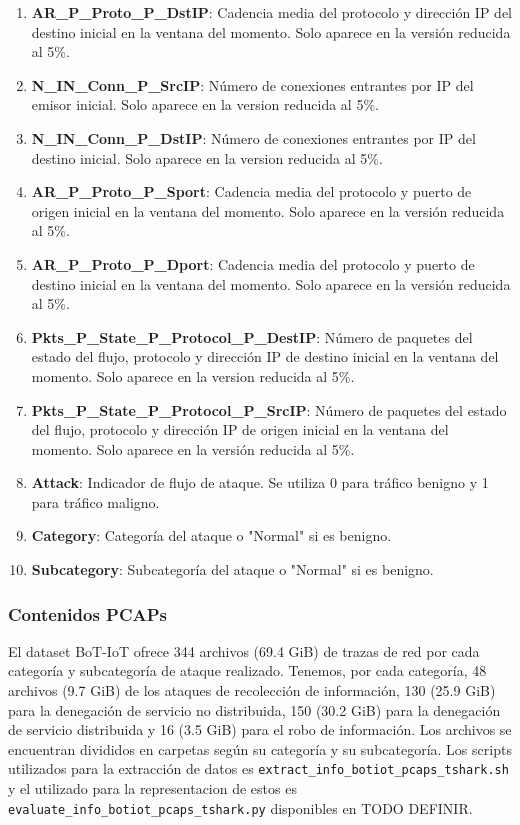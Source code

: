 \begin{enumerate}
    \item \textbf{AR\_P\_Proto\_P\_DstIP}: Cadencia media del protocolo y dirección IP del destino inicial en la ventana del momento. Solo aparece en la versión reducida al 5\%.
    \item \textbf{N\_IN\_Conn\_P\_SrcIP}: Número de conexiones entrantes por IP del emisor inicial. Solo aparece en la version reducida al 5\%.
    \item \textbf{N\_IN\_Conn\_P\_DstIP}: Número de conexiones entrantes por IP del destino inicial. Solo aparece en la version reducida al 5\%.
    \item \textbf{AR\_P\_Proto\_P\_Sport}: Cadencia media del protocolo y puerto  de origen inicial en la ventana del momento. Solo aparece en la versión reducida al 5\%.
    \item \textbf{AR\_P\_Proto\_P\_Dport}: Cadencia media del protocolo y puerto  de destino inicial en la ventana del momento. Solo aparece en la versión reducida al 5\%.
    \item \textbf{Pkts\_P\_State\_P\_Protocol\_P\_DestIP}: Número de paquetes del estado del flujo, protocolo y dirección IP de destino inicial en la ventana del momento. Solo aparece en la version reducida al 5\%.
    \item \textbf{Pkts\_P\_State\_P\_Protocol\_P\_SrcIP}: Número de paquetes del estado del flujo, protocolo y dirección IP de origen inicial en la ventana del momento. Solo aparece en la versión reducida al 5\%.
    \item \textbf{Attack}: Indicador de flujo de ataque. Se utiliza 0 para tráfico benigno y 1 para tráfico maligno.
    \item \textbf{Category}: Categoría del ataque o "Normal" si es benigno.
    \item \textbf{Subcategory}: Subcategoría del ataque o "Normal" si es benigno.
\end{enumerate}


\subsubsection{Contenidos PCAPs}

El dataset BoT-IoT ofrece 344 archivos (69.4 GiB) de trazas de red por cada categoría y subcategoría de ataque realizado. Tenemos, por cada categoría, 48 archivos (9.7 GiB) de los ataques de recolección de información, 130 (25.9 GiB) para la denegación de servicio no distribuida, 150 (30.2 GiB) para la denegación de servicio distribuida y 16 (3.5 GiB) para el robo de información. Los archivos se encuentran divididos en carpetas según su categoría y su subcategoría. Los scripts utilizados para la extracción de datos es \texttt{extract\_info\_botiot\_pcaps\_tshark.sh} y el utilizado para la representacion de estos es \texttt{evaluate\_info\_botiot\_pcaps\_tshark.py} disponibles en TODO DEFINIR.

